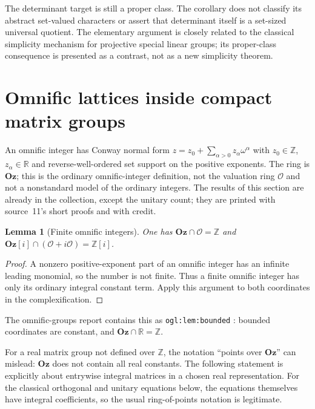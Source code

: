 \documentclass[11pt,letterpaper]{article}
\numberwithin{equation}{section}
\newtheorem{lemma}[lemma]{Lemma}
\theoremstyle{definition}
\theoremstyle{remark}
\newcommand{\R}{\mathbb R}
\newcommand{\Z}{\mathbb Z}
\newcommand{\OO}{\mathcal O}
\newcommand{\Oz}{\mathbf{Oz}}
\begin{document}
The determinant target is still a proper class. The corollary does not classify
its abstract set-valued characters or assert that determinant itself is a
set-sized universal quotient. The elementary argument is closely related to the
classical simplicity mechanism for projective special linear groups; its
proper-class consequence is presented as a contrast, not as a new simplicity
theorem.

\section{Omnific lattices inside compact matrix groups}\label{e3:cpt:sec:omnific}

An omnific integer has Conway normal form
$z=z_0+\sum_{\alpha>0}z_\alpha\omega^\alpha$ with $z_0\in\Z$, $z_\alpha\in\R$
and reverse-well-ordered set support on the positive exponents. The ring is
$\Oz$; this is the ordinary omnific-integer definition, not the valuation ring
$\OO$ and not a nonstandard model of the ordinary integers. The results of this
section are already in the collection, except the unitary count; they are
printed with source~11's short proofs and with credit.

\begin{lemma}[Finite omnific integers]\label{e3:cpt:lem:ozfinite}
One has $\Oz\cap\OO=\Z$ and $\Oz[i]\cap(\OO+i\OO)=\Z[i]$.
\end{lemma}
\begin{proof}
A nonzero positive-exponent part of an omnific integer has an infinite leading
monomial, so the number is not finite. Thus a finite omnific integer has only
its ordinary integral constant term. Apply this argument to both coordinates in
the complexification.
\end{proof}

The omnific-groups report contains this as \texttt{ogl:lem:bounded}
\cite{RepoOGL}: bounded coordinates are constant, and $\Oz\cap\R=\Z$.

For a real matrix group not defined over $\Z$, the notation ``points over
$\Oz$'' can mislead: $\Oz$ does not contain all real constants. The following
statement is explicitly about entrywise integral matrices in a chosen real
representation. For the classical orthogonal and unitary equations below, the
equations themselves have integral coefficients, so the usual ring-of-points
notation is legitimate.
\end{document}
